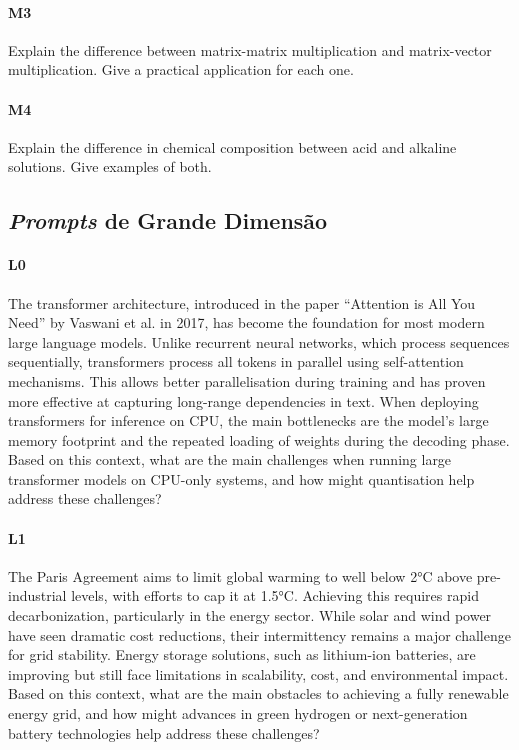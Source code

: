 \paragraph{M3} Explain the difference between matrix-matrix multiplication and matrix-vector
               multiplication. Give a practical application for each one.

\paragraph{M4} Explain the difference in chemical composition between acid and alkaline solutions.
               Give examples of both.

\subsection{\emph{Prompts} de Grande Dimensão}

\paragraph{L0} The transformer architecture, introduced in the paper ``Attention is All You Need''
               by Vaswani et al. in 2017, has become the foundation for most modern large language
               models. Unlike recurrent neural networks, which process sequences sequentially,
               transformers process all tokens in parallel using self-attention mechanisms. This
               allows better parallelisation during training and has proven more effective at
               capturing long-range dependencies in text. When deploying transformers for inference
               on CPU, the main bottlenecks are the model’s large memory footprint and the repeated
               loading of weights during the decoding phase. Based on this context, what are the
               main challenges when running large transformer models on CPU-only systems, and how
               might quantisation help address these challenges?

\paragraph{L1} The Paris Agreement aims to limit global warming to well below 2°C above
               pre-industrial levels, with efforts to cap it at 1.5°C. Achieving this requires
               rapid decarbonization, particularly in the energy sector. While solar and wind power
               have seen dramatic cost reductions, their intermittency remains a major challenge for
               grid stability. Energy storage solutions, such as lithium-ion batteries, are
               improving but still face limitations in scalability, cost, and environmental impact.
               Based on this context, what are the main obstacles to achieving a fully renewable
               energy grid, and how might advances in green hydrogen or next-generation battery
               technologies help address these challenges?

